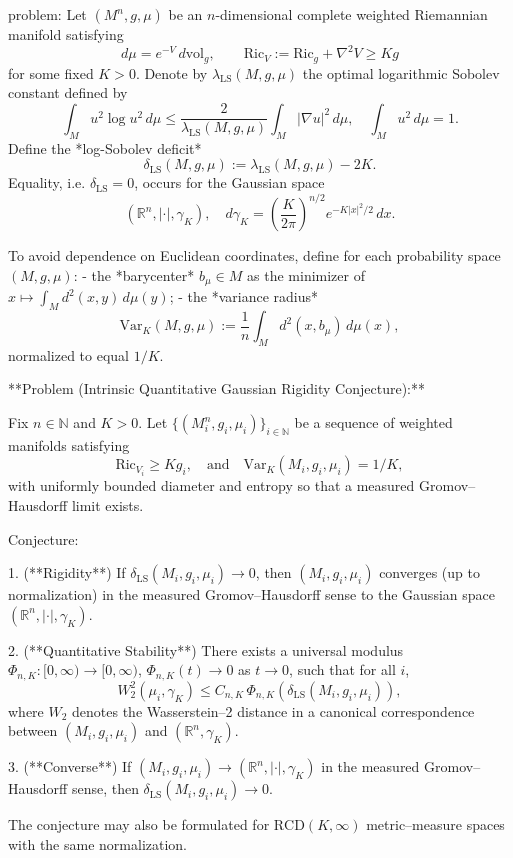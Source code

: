 problem:  
Let \((M^n,g,\mu)\) be an \(n\)-dimensional complete weighted Riemannian manifold satisfying  
\[
d\mu = e^{-V}\,d\mathrm{vol}_g, \qquad \mathrm{Ric}_V := \mathrm{Ric}_g + \nabla^2 V \ge K g
\]
for some fixed \(K>0\).  
Denote by \(\lambda_{\mathrm{LS}}(M,g,\mu)\) the optimal logarithmic Sobolev constant defined by  
\[
\int_M u^2\log u^2\,d\mu \le \frac{2}{\lambda_{\mathrm{LS}}(M,g,\mu)}\int_M |\nabla u|^2\,d\mu, 
\quad \int_M u^2\,d\mu = 1.
\]
Define the *log-Sobolev deficit*  
\[
\delta_{\mathrm{LS}}(M,g,\mu):=\lambda_{\mathrm{LS}}(M,g,\mu)-2K.
\]
Equality, i.e. \(\delta_{\mathrm{LS}}=0\), occurs for the Gaussian space  
\[
(\mathbb{R}^n,|\cdot|,\gamma_K),\quad d\gamma_K = \left(\frac{K}{2\pi}\right)^{n/2}e^{-K|x|^2/2}\,dx.
\]

To avoid dependence on Euclidean coordinates, define for each probability space \((M,g,\mu)\):
- the *barycenter* \(b_\mu\in M\) as the minimizer of \(x\mapsto \int_M d^2(x,y)\,d\mu(y)\);
- the *variance radius*
\[
\mathrm{Var}_K(M,g,\mu) := \frac{1}{n}\int_M d^2(x,b_\mu)\,d\mu(x),
\]
normalized to equal \(1/K\).

**Problem (Intrinsic Quantitative Gaussian Rigidity Conjecture):**  

Fix \(n\in\mathbb{N}\) and \(K>0\).  
Let \(\{(M_i^n,g_i,\mu_i)\}_{i\in\mathbb{N}}\) be a sequence of weighted manifolds satisfying  
\[
\mathrm{Ric}_{V_i} \ge K g_i, \quad \text{and} \quad \mathrm{Var}_K(M_i,g_i,\mu_i)=1/K,
\]
with uniformly bounded diameter and entropy so that a measured Gromov–Hausdorff limit exists.

Conjecture:

1. (**Rigidity**)  
If \(\delta_{\mathrm{LS}}(M_i,g_i,\mu_i)\to 0\), then \((M_i,g_i,\mu_i)\) converges (up to normalization) in the measured Gromov–Hausdorff sense to the Gaussian space \((\mathbb{R}^n,|\cdot|,\gamma_K)\).

2. (**Quantitative Stability**)  
There exists a universal modulus \(\Phi_{n,K}:[0,\infty)\to[0,\infty)\), \(\Phi_{n,K}(t)\to0\) as \(t\to0\), such that for all \(i\),
\[
W_2^2(\mu_i,\gamma_K) \le C_{n,K}\,\Phi_{n,K}(\delta_{\mathrm{LS}}(M_i,g_i,\mu_i)),
\]
where \(W_2\) denotes the Wasserstein–2 distance in a canonical correspondence between \((M_i,g_i,\mu_i)\) and \((\mathbb{R}^n,\gamma_K)\).

3. (**Converse**)  
If \((M_i,g_i,\mu_i)\to (\mathbb{R}^n,|\cdot|,\gamma_K)\) in the measured Gromov–Hausdorff sense, then \(\delta_{\mathrm{LS}}(M_i,g_i,\mu_i)\to 0.\)

The conjecture may also be formulated for \(\mathrm{RCD}(K,\infty)\) metric–measure spaces with the same normalization.

